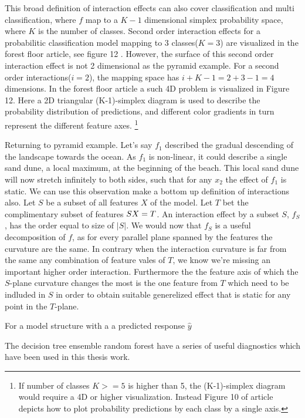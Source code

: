 This broad definition of interaction effects can also cover classification and multi classification, where $f$ map to a $K-1$ dimensional simplex probability space, where $K$ is the number of classes. Second order interaction effects for a probabilitic classification model mapping to 3 classes($K=3$) are visualized in the forest floor article, see figure 12 \cite{welling2016forest}. However, the surface of this second order interaction effect is not 2 dimensional as the pyramid example. For a second order interactions($i=2$), the mapping space has $i+K-1=2+3-1=4$ dimensions. In the forest floor article a such 4D problem is visualized in Figure 12. Here a 2D triangular (K-1)-simplex diagram is used to describe the probability distribution of predictions, and different color gradients in turn represent the different feature axes. 
\footnote{If number of classes $K>=5$ is higher than 5, the (K-1)-simplex diagram would require a 4D or higher visualization. Instead Figure 10 of article depicts how to plot probability predictions by each class by a single axis.}

Returning to pyramid example. Let's say $f_1$ described the gradual descending of the landscape towards the ocean. As $f_1$ is non-linear, it could describe a single sand dune, a local maximum, at the beginning of the beach. This local sand dune will now stretch infinitely to both sides, such that for any $x_2$ the effect of $f_1$ is static. We can use this observation make a bottom up definition of interactions also. Let $S$ be a subset of all features $X$ of the model. Let $T$ bet the complimentary subset of features $S \\ X = T$. An interaction effect by a subset $S$, $f_S$, has the order equal to size of $|S|$. We would now that $f_S$ is a useful decomposition of $f$, as for every parallel plane spanned by the features the curvature are the same. In contrary when the  interaction curvature is far from the same any combination of feature vales of $T$, we know we're missing an important higher order interaction. Furthermore the the feature axis of which the $S$-plane curvature changes the most is the one feature from $T$ which need to be indluded in $S$ in order to obtain suitable generelized effect that is static for any point in the $T$-plane.


For a model structure with a a predicted response $\hat{y}$ 

The decision tree ensemble random forest have a series of useful diagnostics which have been used in this thesis work.

